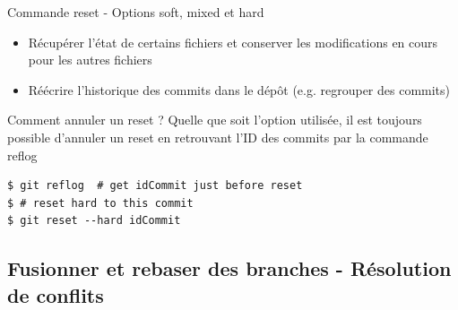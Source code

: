 \documentclass[a4paper,11pt]{beamer}
\newcounter{exampleBlockCounter}
\begin{document}
\begin{frame}[fragile]
\begin{alertblock}{Commande reset - Options soft, mixed et hard}
\begin{itemize}
\justifying
\item Récupérer l'état de certains fichiers et conserver les modifications en cours pour les autres fichiers
\item Réécrire l'historique des commits dans le dépôt (e.g. regrouper des commits)
\end{itemize}
\end{alertblock}

\begin{alertblock}{Comment annuler un reset ?}
\justifying
Quelle que soit l'option utilisée, il est toujours possible d'annuler un reset en retrouvant l'ID des commits par la commande reflog
\begin{lstlisting}
$ git reflog  # get idCommit just before reset
$ # reset hard to this commit
$ git reset --hard idCommit
\end{lstlisting}
\end{alertblock}

\center{
\textbf{\textcolor{red}{-\smallskip-hard reste une option dangereuse !}}}

\end{frame}


\subsection{Fusionner et rebaser des branches - Résolution de conflits}
\end{document}
